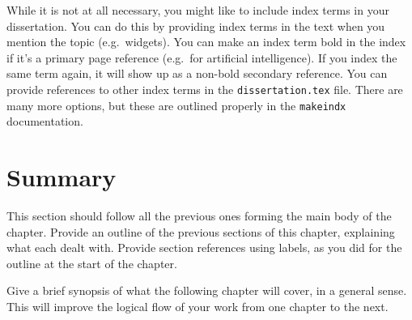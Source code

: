 While it is not at all necessary, you might like to include index terms in your dissertation. You can do this by providing index terms in the text when you mention the topic (e.g.\ widgets). You can make an index term bold in the index if it's a primary page reference (e.g.\ for artificial intelligence). If you index the same term again, it will show up as a non-bold secondary reference. You can provide references to other index terms in the \texttt{dissertation.tex} file. There are many more options, but these are outlined properly in the \texttt{makeindx} documentation.


\section{Summary}
\label{sec:first:summary}

This section should follow all the previous ones forming the main body of the chapter. Provide an outline of the previous sections of this chapter, explaining what each dealt with. Provide section references using labels, as you did for the outline at the start of the chapter.

Give a brief synopsis of what the following chapter will cover, in a general sense. This will improve the logical flow of your work from one chapter to the next.

